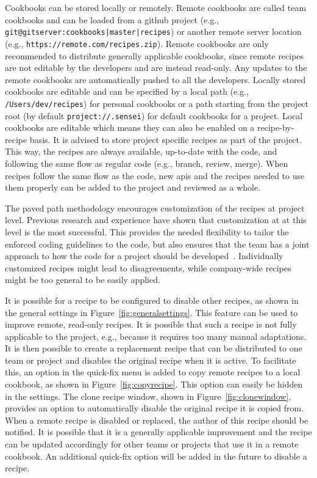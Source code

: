 Cookbooks can be stored locally or remotely.
Remote cookbooks are called team cookbooks and can be loaded from a github project (e.g., \texttt{git@gitserver:cookbooks|master|recipes}) or another remote server location (e.g., \texttt{https://remote.com/recipes.zip}).
Remote cookbooks are only recommended to distribute generally applicable cookbooks, since remote recipes are not editable by the developers and are instead read-only.
Any updates to the remote cookbooks are automatically pushed to all the developers.
Locally stored cookbooks are editable and can be specified by a local path (e.g., \texttt{/Users/dev/recipes}) for personal cookbooks or a path starting from the project root (by default \texttt{project://.sensei}) for default cookbooks for a project.
Local cookbooks are editable which means they can also be enabled on a recipe-by-recipe basis.
It is advised to store project specific recipes as part of the project.
This way, the recipes are always available, up-to-date with the code, and following the same flow as regular code (e.g., branch, review, merge).
When recipes follow the same flow as the code, new \glspl{api} and the recipes needed to use them properly can be added to the project and reviewed as a whole. 

The paved path methodology encourages customization of the recipes at project level.
Previous research and experience have shown that customization at at this level is the most successful.
This provides the needed flexibility to tailor the enforced coding guidelines to the code, but also ensures that the team has a joint approach to how the code for a project should be developed~\cite{sadowski2015tricorder}.
Individually customized recipes might lead to disagreements, while company-wide recipes might be too general to be easily applied.

It is possible for a recipe to be configured to disable other recipes, as shown in the general settings in Figure~\ref{fig:generalsettings}.
This feature can be used to improve remote, read-only recipes.
It is possible that such a recipe is not fully applicable to the project, e.g., because it requires too many manual adaptations.
It is then possible to create a replacement recipe that can be distributed to one team or project and disables the original recipe when it is active.
To facilitate this, an option in the quick-fix menu is added to copy remote recipes to a local cookbook, as shown in Figure~\ref{fig:copyrecipe}.
This option can easily be hidden in the settings.
The clone recipe window, shown in Figure~\ref{fig:clonewindow}, provides an option to automatically disable the original recipe it is copied from.
When a remote recipe is disabled or replaced, the author of this recipe should be notified.
It is possible that it is a generally applicable improvement and the recipe can be updated accordingly for other teams or projects that use it in a remote cookbook.
An additional quick-fix option will be added in the future to disable a recipe.

